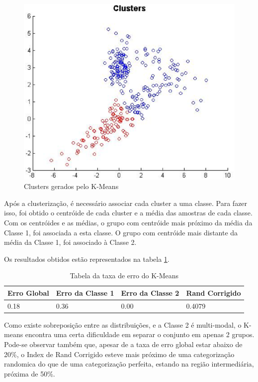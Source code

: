 \begin{figure}[H]
\center
\includegraphics[scale=0.60]{imagens/tecnicas/clusters.eps}
\caption{Clusters gerados pelo K-Means}
\label{fig:clusters}
\end{figure}

Após a clusterização, é necessário associar cada cluster a uma classe. Para fazer isso, foi obtido o centróide de cada cluster e a média das amostras de cada classe. Com os centróides e as médias, o grupo com centróide mais próximo da média da Classe 1, foi associada a esta classe. O grupo com centróide mais distante da média da Classe 1, foi associado à Classe 2.

Os resultados obtidos estão representados na tabela \ref{tab:erro-kmeans}.

\begin{table}[H]
\begin{center}
\begin{tabular}{|l|l|l|l|}
\hline
Erro Global	&	Erro da Classe 1	&	Erro da Classe 2	&	Rand Corrigido	\\
\hline %
	0.18	&		0.36		&		0.00		&	0.4079		\\
\hline
\end{tabular}%
\end{center}   %
\caption{Tabela da taxa de erro do K-Means}
\label{tab:erro-kmeans}
\end{table}

Como existe sobreposição entre as distribuições, e a Classe 2 é multi-modal, o K-means encontra uma certa dificuldade em separar o conjunto em apenas 2 grupos. Pode-se observar também que, apesar de a taxa de erro global estar abaixo de 20\%, o Index de Rand Corrigido esteve mais próximo de uma categorização randomica do que de uma categorização perfeita, estando na região intermediária, próxima de 50\%.

